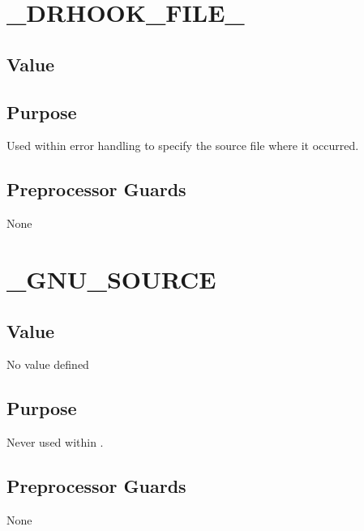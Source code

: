 \documentclass[letterpaper,10pt,english]{sphinxmanual}
\begin{document}
\section{\_DRHOOK\_FILE\_}
\label{\detokenize{definitions/definitions:drhook-file}}\label{\detokenize{definitions/definitions:id3}}

\subsection{Value}
\label{\detokenize{definitions/definitions:id4}}
\sphinxAtStartPar
{}


\subsection{Purpose}
\label{\detokenize{definitions/definitions:id5}}
\sphinxAtStartPar
Used within error handling to specify the source file where it occurred.


\subsection{Preprocessor Guards}
\label{\detokenize{definitions/definitions:id6}}
\sphinxAtStartPar
None


\section{\_GNU\_SOURCE}
\label{\detokenize{definitions/definitions:gnu-source}}\label{\detokenize{definitions/definitions:id7}}

\subsection{Value}
\label{\detokenize{definitions/definitions:id8}}
\sphinxAtStartPar
No value defined


\subsection{Purpose}
\label{\detokenize{definitions/definitions:id9}}
\sphinxAtStartPar
Never used within .


\subsection{Preprocessor Guards}
\label{\detokenize{definitions/definitions:id11}}
\sphinxAtStartPar
None
\end{document}
